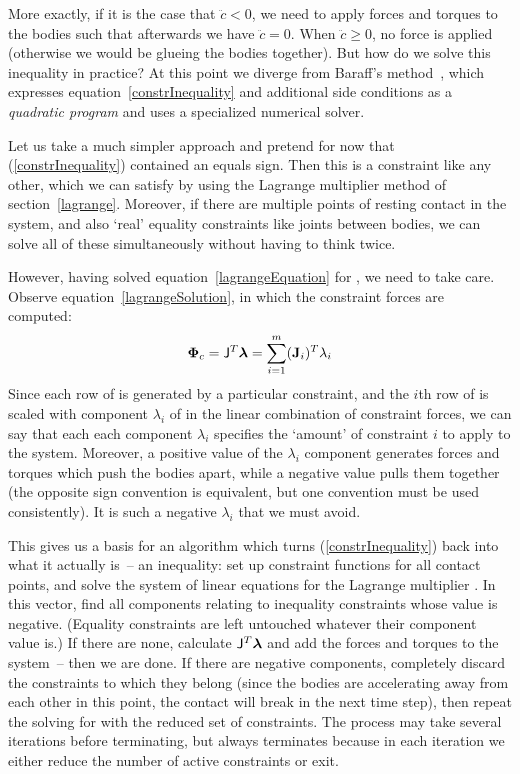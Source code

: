 More exactly, if it is the case that $\ddot{c} < 0$, we need to apply forces and torques
to the bodies such that afterwards we have $\ddot{c} = 0$. When
$\ddot{c} \ge 0$, no force is applied (otherwise we would be glueing the bodies together).
But how do we solve this inequality in practice? At this point we diverge from Baraff's
method~\cite{BaraffWitkin:97}, which expresses equation~\ref{constrInequality} and additional
side conditions as a \emph{quadratic program} and uses a specialized numerical solver.

Let us take a much simpler approach and pretend for now that (\ref{constrInequality})
contained an equals sign. Then this is a constraint like any other, which we can satisfy by using
the Lagrange multiplier method of section~\ref{lagrange}. Moreover, if there are multiple
points of resting contact in the system, and also `real' equality constraints like joints between
bodies, we can solve all of these simultaneously without having to think twice.

However, having solved equation~\ref{lagrangeEquation} for \ve{\lambda}, we need to take care.
Observe equation~\ref{lagrangeSolution}, in which the constraint forces are computed:
\begin{equation}
\ve{\Phi}_c = \m{J}^T\ve{\lambda} = \sum_{i=1}^{m} (\ve{J}_i)^T \lambda_i
\end{equation}
Since each row of  is generated by a particular constraint, and the $i$th row of  is
scaled with component $\lambda_i$ of \ve{\lambda} in the linear combination of constraint forces,
we can say that each each component $\lambda_i$ specifies the `amount' of constraint $i$
to apply to the system. Moreover, a positive value of the $\lambda_i$ component generates
forces and torques which push the bodies apart, while a negative value pulls them together (the
opposite sign convention is equivalent, but one convention must be used consistently). It is such
a negative $\lambda_i$ that we must avoid.

This gives us a basis for an algorithm which turns (\ref{constrInequality}) back into what
it actually is~-- an inequality: set up constraint functions for all contact points, and solve the
system of linear equations for the Lagrange multiplier \ve{\lambda}. In this vector, find all
components relating to inequality constraints whose value is negative. (Equality constraints
are left untouched whatever their \ve{\lambda} component value is.)
If there are none, calculate $\m{J}^T\ve{\lambda}$ and add the forces and torques to the system~--
then we are done. If there are negative components, completely discard the constraints to which
they belong (since the bodies are accelerating away from each other in this point, the contact
will break in the next time step), then repeat the solving for \ve{\lambda} with the reduced set
of constraints. The process may take several iterations before terminating, but always terminates
because in each iteration we either reduce the number of active constraints or exit.

